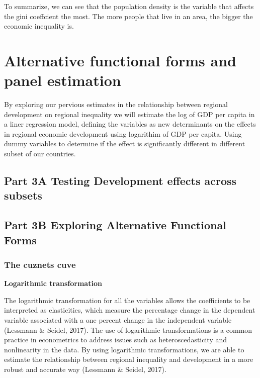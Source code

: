 \documentclass[
  a4paper,
  DIV=11,
  numbers=noendperiod]{scrartcl}
\begin{document}
To summarize, we can see that the population density is the variable
that affects the gini coeffcient the most. The more people that live in
an area, the bigger the economic inequality is.

\hypertarget{alternative-functional-forms-and-panel-estimation}{%
\section{Alternative functional forms and panel
estimation}\label{alternative-functional-forms-and-panel-estimation}}

By exploring our pervious estimates in the relationship between regional
development on regional inequality we will estimate the log of GDP per
capita in a liner regression model, defining the variables as new
determinants on the effects in regional economic development using
logarithim of GDP per capita. Using dummy variables to determine if the
effect is significantly different in different subset of our countries.

\hypertarget{part-3a-testing-development-effects-across-subsets}{%
\subsection{Part 3A Testing Development effects across
subsets}\label{part-3a-testing-development-effects-across-subsets}}

\hypertarget{part-3b-exploring-alternative-functional-forms}{%
\subsection{Part 3B Exploring Alternative Functional
Forms}\label{part-3b-exploring-alternative-functional-forms}}

\hypertarget{the-cuznets-cuve}{%
\subsubsection{\texorpdfstring{\textbf{The cuznets
cuve}}{The cuznets cuve}}\label{the-cuznets-cuve}}

\textbf{Logarithmic transformation}

The logarithmic transformation for all the variables allows the
coefficients to be interpreted as elasticities, which measure the
percentage change in the dependent variable associated with a one
percent change in the independent variable (Lessmann \& Seidel, 2017).
The use of logarithmic transformations is a common practice in
econometrics to address issues such as heteroscedasticity and
nonlinearity in the data. By using logarithmic transformations, we are
able to estimate the relationship between regional inequality and
development in a more robust and accurate way (Lessmann \& Seidel,
2017).
\end{document}
